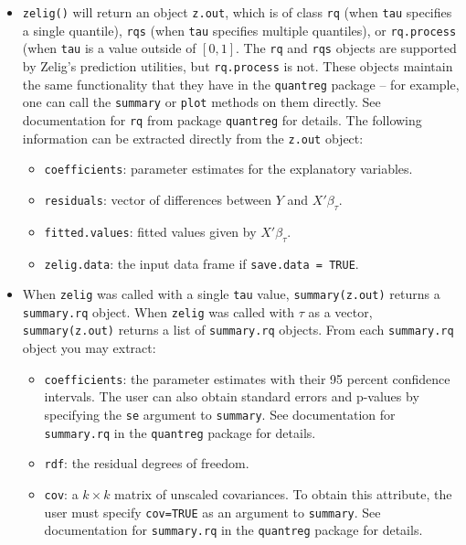\begin{itemize}
  \item {\tt zelig()} will return an object {\tt z.out}, which is of class 
    {\tt rq} (when {\tt tau} specifies a single quantile), {\tt rqs} (when {\tt tau}
    specifies multiple quantiles), or {\tt rq.process} (when {\tt tau} is a value
    outside of $[0,1]$. The {\tt rq} and {\tt rqs} objects are supported by Zelig's
    prediction utilities, but {\tt rq.process} is not. These objects maintain the
    same functionality that they have in the {\tt quantreg} package -- for example,
    one can call the {\tt summary} or {\tt plot} methods on them directly.
    See documentation for {\tt rq} from package {\tt quantreg} for details.
    The following information can be extracted directly from the {\tt z.out}
    object:
   \begin{itemize}
   \item {\tt coefficients}: parameter estimates for the explanatory
     variables.
   \item {\tt residuals}: vector of differences between $Y$ and $X'\beta_\tau$.
   \item {\tt fitted.values}: fitted values given by $X'\beta_\tau$.
   \item {\tt zelig.data}: the input data frame if {\tt save.data = TRUE}.  
   \end{itemize}
  
\item When {\tt zelig} was called with a single {\tt tau} value,
   {\tt summary(z.out)} returns a {\tt summary.rq} object. When {\tt zelig}
   was called with $\tau$ as a vector, {\tt summary(z.out)} returns a list
   of {\tt summary.rq} objects. From each {\tt summary.rq} object you may
   extract:
   \begin{itemize}
   \item {\tt coefficients}: the parameter estimates with their 95 percent
     confidence intervals. The user can also obtain standard errors and p-values
     by specifying the {\tt se} argument to {\tt summary}. See documentation
     for {\tt summary.rq} in the {\tt quantreg} package for details.
   \item {\tt rdf}: the residual degrees of freedom.
   \item{\tt cov}: a $k \times k$ matrix of unscaled covariances. To obtain
     this attribute, the user must specify {\tt cov=TRUE} as an argument to 
     {\tt summary}. See documentation for {\tt summary.rq} in the
     {\tt quantreg} package for details.
   \end{itemize}
   

\end{itemize}
